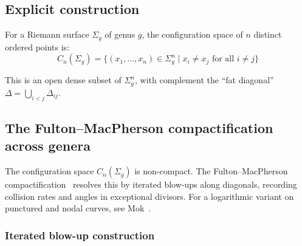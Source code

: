 \subsection{Explicit construction}

\begin{definition}\label{def:config-space-genus-g}
For a Riemann surface $\Sigma_g$ of genus $g$, the configuration space of $n$ distinct ordered points is:
\[C_n(\Sigma_g) = \{(x_1, \ldots, x_n) \in \Sigma_g^n \mid x_i \neq x_j \text{ for all } i \neq j\}\]

This is an open dense subset of $\Sigma_g^n$, with complement the ``fat diagonal'' $\Delta = \bigcup_{i<j} \Delta_{ij}$.
\end{definition}

\subsection{The Fulton--MacPherson compactification across genera}

The configuration space $C_n(\Sigma_g)$ is non-compact.  The Fulton--MacPherson compactification~\cite{FM94} resolves this by iterated blow-ups along diagonals, recording collision rates and angles in exceptional divisors. For a logarithmic variant on punctured and nodal curves, see Mok~\cite{Mok25}.

\subsubsection{Iterated blow-up construction}

